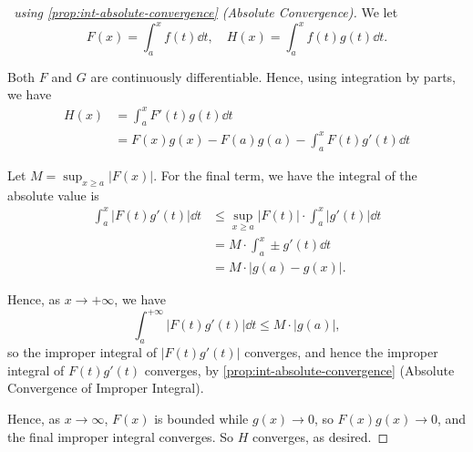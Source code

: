 \documentclass[11pt]{article}
\numberwithin{equation}{section}
\theoremstyle{definition}
\theoremstyle{remark}
\newcommand{\pqty}[1]{\left(#1\right)}
\newcommand{\abs}[1]{\left|#1\right|}
\newcommand{\plusinfty}{+\infty}
\begin{document}
\begin{proof}[\proofname\ using \autoref{prop:int-absolute-convergence} (Absolute Convergence)]
    We let
    \[
        F\pqty{x} = \int_{a}^{x} f\pqty{t} \dd{t}, \quad H\pqty{x} = \int_{a}^{x} f\pqty{t} g\pqty{t} \dd{t}.
    \]

    Both \(F\) and \(G\) are continuously differentiable. Hence, using  integration by parts, we have
    \begin{align*}
        H\pqty{x} &= \int_{a}^{x} F'\pqty{t} g\pqty{t} \dd{t} \\
        &= F\pqty{x} g\pqty{x} - F\pqty{a} g\pqty{a} - \int_{a}^{x} F\pqty{t} g'\pqty{t} \dd{t}
    \end{align*}

    Let \(M = \sup_{x \geq a} \abs{F\pqty{x}}\). For the final term, we have the integral of the absolute value is
    \begin{align*}
        \int_{a}^{x} \abs{F\pqty{t} g'\pqty{t}} \dd{t} &\leq \sup_{x \geq a} \abs{F\pqty{t}} \cdot \int_{a}^{x} \abs{g'\pqty{t}} \dd{t} \\
        &= M \cdot \int_{a}^{x} \pm g'\pqty{t} \dd{t} \\
        &= M \cdot \abs{g\pqty{a} - g\pqty{x}}.
    \end{align*}

    Hence, as \(x \to \plusinfty\), we have
    \[
        \int_{a}^{\plusinfty} \abs{F\pqty{t} g'\pqty{t}} \dd{t} \leq M \cdot \abs{g\pqty{a}},
    \]
    so the improper integral of  \(\abs{F\pqty{t} g'\pqty{t}}\) converges, and hence the improper integral of \(F\pqty{t} g'\pqty{t}\) converges, by \autoref{prop:int-absolute-convergence} (Absolute Convergence of Improper Integral).

    Hence, as \(x \to \infty\), \(F\pqty{x}\) is bounded while \(g\pqty{x} \to 0\), so \(F\pqty{x} g\pqty{x} \to 0\), and the final improper integral converges. So \(H\) converges, as desired.
\end{proof}
\end{document}
